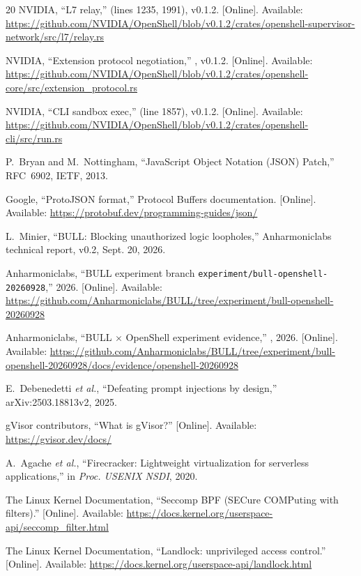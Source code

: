 \documentclass[journal]{IEEEtran}
\begin{document}
\begin{thebibliography}{20}
NVIDIA, ``L7 relay,''  (lines 1235, 1991), v0.1.2. [Online]. Available: \url{https://github.com/NVIDIA/OpenShell/blob/v0.1.2/crates/openshell-supervisor-network/src/l7/relay.rs}

NVIDIA, ``Extension protocol negotiation,'' , v0.1.2. [Online]. Available: \url{https://github.com/NVIDIA/OpenShell/blob/v0.1.2/crates/openshell-core/src/extension_protocol.rs}

NVIDIA, ``CLI sandbox exec,''  (line 1857), v0.1.2. [Online]. Available: \url{https://github.com/NVIDIA/OpenShell/blob/v0.1.2/crates/openshell-cli/src/run.rs}

P.~Bryan and M.~Nottingham, ``JavaScript Object Notation (JSON) Patch,'' RFC~6902, IETF, 2013.

Google, ``ProtoJSON format,'' Protocol Buffers documentation. [Online]. Available: \url{https://protobuf.dev/programming-guides/json/}

L.~Minier, ``BULL: Blocking unauthorized logic loopholes,'' Anharmoniclabs technical report, v0.2, Sept. 20, 2026.

Anharmoniclabs, ``BULL experiment branch \texttt{experiment/bull-openshell-20260928},'' 2026. [Online]. Available: \url{https://github.com/Anharmoniclabs/BULL/tree/experiment/bull-openshell-20260928}

Anharmoniclabs, ``BULL $\times$ OpenShell experiment evidence,'' , 2026. [Online]. Available: \url{https://github.com/Anharmoniclabs/BULL/tree/experiment/bull-openshell-20260928/docs/evidence/openshell-20260928}

E.~Debenedetti \emph{et al.}, ``Defeating prompt injections by design,'' arXiv:2503.18813v2, 2025.

gVisor contributors, ``What is gVisor?'' [Online]. Available: \url{https://gvisor.dev/docs/}

A.~Agache \emph{et al.}, ``Firecracker: Lightweight virtualization for serverless applications,'' in \emph{Proc. USENIX NSDI}, 2020.

The Linux Kernel Documentation, ``Seccomp BPF (SECure COMPuting with filters).'' [Online]. Available: \url{https://docs.kernel.org/userspace-api/seccomp_filter.html}

The Linux Kernel Documentation, ``Landlock: unprivileged access control.'' [Online]. Available: \url{https://docs.kernel.org/userspace-api/landlock.html}

\end{thebibliography}
\end{document}
